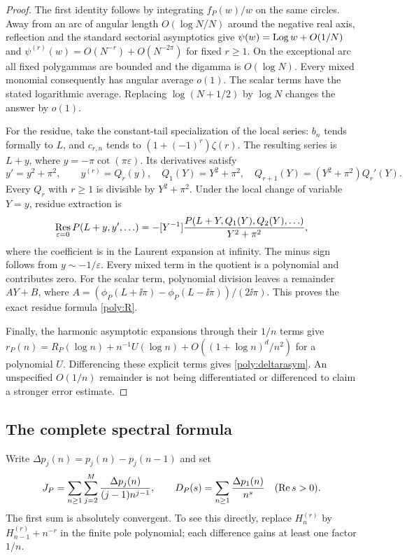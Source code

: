 \begin{proof}
The first identity follows by integrating $f_P(w)/w$ on the same
circles. Away from an arc of angular length $O(\log N/N)$ around the
negative real axis, reflection and the standard sectorial asymptotics
give $\psi(w)=\operatorname{Log} w+O(1/N)$ and
$\psi^{(r)}(w)=O(N^{-r})+O(N^{-2\pi})$ for fixed $r\ge1$.
On the exceptional arc all fixed polygammas are bounded and the digamma
is $O(\log N)$. Every mixed monomial consequently has angular average
$o(1)$. The scalar terms have the stated logarithmic average. Replacing
$\log(N+1/2)$ by $\log N$ changes the answer by $o(1)$.

For the residue, take the constant-tail specialization of the local
series: $b_n$ tends formally to $L$, and
$c_{r,n}$ tends to $(1+(-1)^r)\zeta(r)$. The resulting series is
$L+y$, where $y=-\pi\cot(\pi\varepsilon)$. Its derivatives satisfy
\[
 y'=y^2+\pi^2,
 \qquad y^{(r)}=Q_r(y),\quad
 Q_1(Y)=Y^2+\pi^2,\quad
 Q_{r+1}(Y)=(Y^2+\pi^2)Q_r'(Y).
\]
Every $Q_r$ with $r\ge1$ is divisible by $Y^2+\pi^2$.
Under the local change of variable $Y=y$, residue extraction is
\begin{equation}\label{poly:reschange}
 \operatorname*{Res}_{\varepsilon=0}P(L+y,y',\ldots)
 =-[Y^{-1}]
 \frac{P(L+Y,Q_1(Y),Q_2(Y),\ldots)}{Y^2+\pi^2},
\end{equation}
where the coefficient is in the Laurent expansion at infinity.
The minus sign follows from $y\sim-1/\varepsilon$.
Every mixed term in the quotient is a polynomial and contributes zero.
For the scalar term, polynomial division leaves a remainder $AY+B$,
where
$A=(\phi_P(L+\ii\pi)-\phi_P(L-\ii\pi))/(2\ii\pi)$.
This proves the exact residue formula \eqref{poly:R}.

Finally, the harmonic asymptotic expansions through their $1/n$ terms
give $r_P(n)=R_P(\log n)+n^{-1}U(\log n)
+O((1+\log n)^d/n^2)$ for a polynomial $U$.
Differencing these explicit terms gives \eqref{poly:deltarasym}.
An unspecified $O(1/n)$ remainder is not being differentiated or
differenced to claim a stronger error estimate.
\end{proof}

\subsection{The complete spectral formula}

Write $\Delta p_j(n)=p_j(n)-p_j(n-1)$ and set
\begin{equation}\label{poly:JD}
 J_P=\sum_{n\ge1}\sum_{j=2}^M
          \frac{\Delta p_j(n)}{(j-1)n^{j-1}},\qquad
 D_P(s)=\sum_{n\ge1}\frac{\Delta p_1(n)}{n^s}\quad(\operatorname{Re} s>0).
\end{equation}
The first sum is absolutely convergent. To see this directly, replace
$H_n^{(r)}$ by $H_{n-1}^{(r)}+n^{-r}$ in the finite pole polynomial;
each difference gains at least one factor $1/n$.

